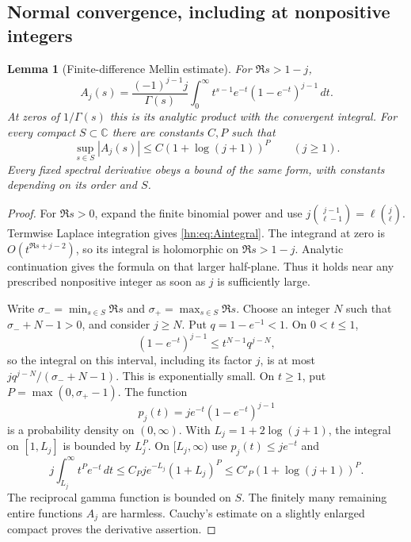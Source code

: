 \documentclass[11pt,a4paper]{article}
\numberwithin{equation}{section}
\newtheorem{lemma}[theorem]{Lemma}
\theoremstyle{definition}
\theoremstyle{remark}
\begin{document}
\subsection{Normal convergence, including at nonpositive integers}

\begin{lemma}[Finite-difference Mellin estimate]\label{hn:lem:Aj}
For $\Re s>1-j$,
\begin{equation}\label{hn:eq:Aintegral}
 A_j(s)=\frac{(-1)^{j-1}j}{\Gamma(s)}
       \int_0^\infty t^{s-1}e^{-t}(1-e^{-t})^{j-1}\,dt.
\end{equation}
At zeros of $1/\Gamma(s)$ this is its analytic product with the
convergent integral. For every compact $S\subset\mathbb C$ there
are constants $C,P$ such that
\begin{equation}\label{hn:eq:Abound}
 \sup_{s\in S}|A_j(s)|\le C(1+\log(j+1))^P\qquad(j\ge1).
\end{equation}
Every fixed spectral derivative obeys a bound of the same form,
with constants depending on its order and $S$.
\end{lemma}

\begin{proof}
For $\Re s>0$, expand the finite binomial power and use
$j\binom{j-1}{\ell-1}=\ell\binom j\ell$.
Termwise Laplace integration gives \eqref{hn:eq:Aintegral}.
The integrand at zero is $O(t^{\Re s+j-2})$, so its integral is
holomorphic on $\Re s>1-j$. Analytic continuation gives the formula
on that larger half-plane. Thus it holds near any prescribed
nonpositive integer as soon as $j$ is sufficiently large.

Write $\sigma_-=\min_{s\in S}\Re s$ and
$\sigma_+=\max_{s\in S}\Re s$. Choose an integer $N$ such that
$\sigma_-+N-1>0$, and consider $j\ge N$. Put $q=1-e^{-1}<1$.
On $0<t\le1$,
\[
 (1-e^{-t})^{j-1}\le t^{N-1}q^{j-N},
\]
so the integral on this interval, including its factor $j$, is at
most $j q^{j-N}/(\sigma_-+N-1)$. This is exponentially small.
On $t\ge1$, put $P=\max(0,\sigma_+-1)$. The function
\[
                 p_j(t)=je^{-t}(1-e^{-t})^{j-1}
\]
is a probability density on $(0,\infty)$. With
$L_j=1+2\log(j+1)$, the integral on $[1,L_j]$ is bounded by $L_j^P$.
On $[L_j,\infty)$ use $p_j(t)\le je^{-t}$ and
\[
 j\int_{L_j}^\infty t^Pe^{-t}\,dt
 \le C_Pje^{-L_j}(1+L_j)^P
 \le C'_P(1+\log(j+1))^P.
\]
The reciprocal gamma function is bounded on $S$. The finitely many
remaining entire functions $A_j$ are harmless. Cauchy's estimate
on a slightly enlarged compact proves the derivative assertion.
\end{proof}
\end{document}
